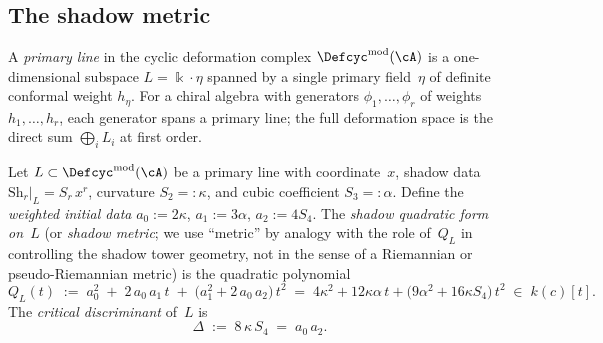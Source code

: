 
\subsection{The shadow metric}
\label{sec:shadow-metric}

\begin{definition}
\label{def:shadow-metric}
A \emph{primary line} in the
cyclic deformation complex $\Defcyc^{\mathrm{mod}}(\cA)$ is a
one-dimensional subspace $L = \Bbbk\cdot\eta$ spanned by a
single primary field~$\eta$ of definite conformal weight
$h_\eta$.  For a chiral algebra with generators
$\phi_1,\dotsc,\phi_r$ of weights $h_1,\dotsc,h_r$,
each generator spans a primary line; the full deformation
space is the direct sum $\bigoplus_i L_i$ at first order.

Let $L \subset \Defcyc^{\mathrm{mod}}(\cA)$ be a
primary line with coordinate~$x$, shadow data
$\mathrm{Sh}_r|_L = S_r\,x^r$, curvature
$S_2 =: \kappa$, and cubic coefficient
$S_3 =: \alpha$.  Define the \emph{weighted initial data}
$a_0 := 2\kappa$, $a_1 := 3\alpha$, $a_2 := 4S_4$.
The \emph{shadow quadratic form on~$L$} (or \emph{shadow metric};
we use ``metric'' by analogy with the role of~$Q_L$ in controlling
the shadow tower geometry, not in the sense of a Riemannian or
pseudo-Riemannian metric) is the quadratic polynomial
\begin{equation}\label{eq:shadow-metric}
  Q_L(t)
  \;:=\;
  a_0^2
  \;+\;
  2\,a_0\,a_1\,t
  \;+\;
  \bigl(a_1^2 + 2\,a_0\,a_2\bigr)\,t^2
  \;=\;
  4\kappa^2 + 12\kappa\alpha\,t
  + \bigl(9\alpha^2 + 16\kappa S_4\bigr)\,t^2
  \;\in\; k(c)[t].
\end{equation}
The \emph{critical discriminant} of~$L$ is
\begin{equation}\label{eq:critical-discriminant}
  \Delta \;:=\; 8\,\kappa\,S_4
  \;=\; a_0\,a_2.
\end{equation}
\end{definition}

